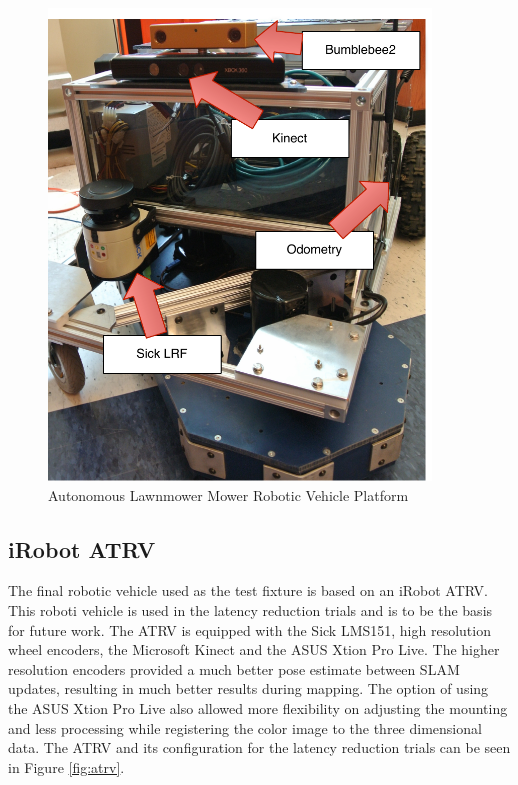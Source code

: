 \documentclass[12pt]{report}
\begin{document}
\begin{figure}[ht]
  \centering
  \includegraphics[width=4in,keepaspectratio]{lawnmower.pdf}
  \caption{Autonomous Lawnmower Mower Robotic Vehicle Platform}
  \label{fig:lawnmower}
\end{figure}

\subsection{iRobot ATRV}
The final robotic vehicle used as the test fixture is based on an iRobot ATRV.  This roboti vehicle is used in the latency reduction trials and is to be the basis for future work.  The ATRV is equipped with the Sick LMS151, high resolution wheel encoders, the Microsoft Kinect and the ASUS Xtion Pro Live.  The higher resolution encoders provided a much better pose estimate between SLAM updates, resulting in much better results during mapping.  The option of using the ASUS Xtion Pro Live also allowed more flexibility on adjusting the mounting and less processing while registering the color image to the three dimensional data.  The ATRV and its configuration for the latency reduction trials can be seen in Figure \ref{fig:atrv}.
\end{document}
